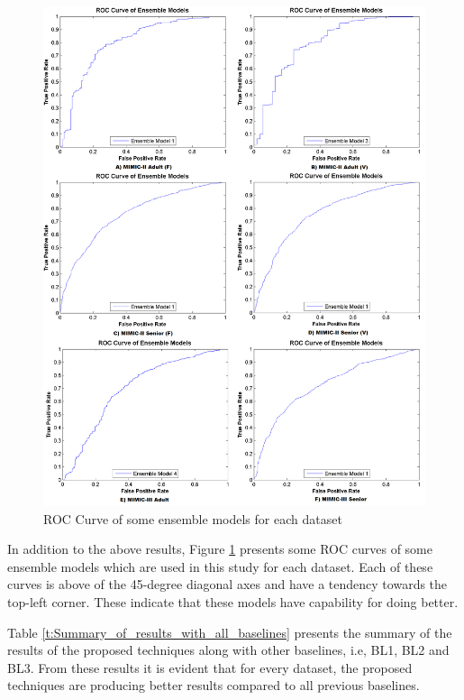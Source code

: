 \begin{figure}[h] 
	\centering 
	\includegraphics[scale=0.25]{fig/ROC-top.png}
	\caption{ROC Curve of some ensemble models for each dataset}
	\label{F:ROC}
\end{figure} 

In addition to the above results, Figure \ref{F:ROC} presents some ROC curves of some ensemble models which are used in this study for each dataset. Each of these curves is above of the 45-degree diagonal axes and have a tendency towards the top-left corner. These indicate that these models have capability for doing better.      
      
Table \ref{t:Summary_of_results_with_all_baselines} presents the summary of the results of the proposed techniques along with other baselines, i.e, BL1, BL2 and BL3. From these results it is evident that for every dataset, the proposed techniques are producing better results compared to all previous baselines.   

